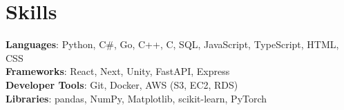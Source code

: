\documentclass[letterpaper,11pt]{article}
\begin{document}
%
\section{Skills}
\begin{itemize}[leftmargin=0.15in, label={}]
  \small{\item{
        \textbf{Languages}{: Python, C\#, Go, C++, C, SQL, JavaScript, TypeScript, HTML, CSS} \\
        \textbf{Frameworks}{: React, Next, Unity, FastAPI, Express} \\
        \textbf{Developer Tools}{: Git, Docker, AWS (S3, EC2, RDS)} \\
        \textbf{Libraries}{: pandas, NumPy, Matplotlib, scikit-learn, PyTorch}
        }}
\end{itemize}

\end{document}
